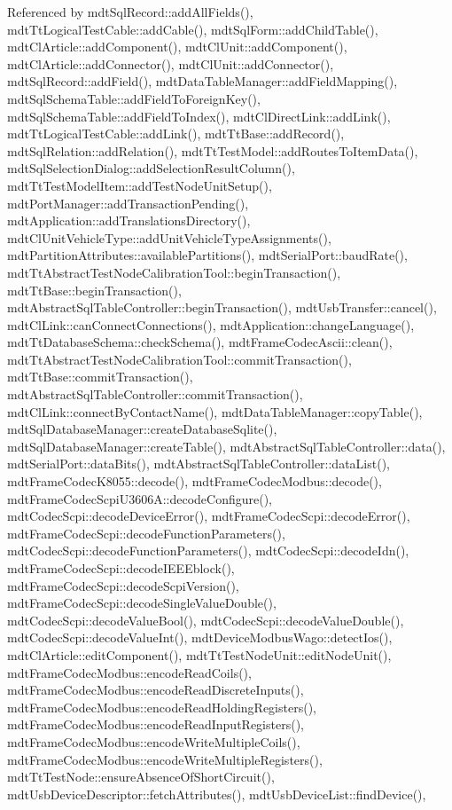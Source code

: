Referenced by mdt\-Sql\-Record\-::add\-All\-Fields(), mdt\-Tt\-Logical\-Test\-Cable\-::add\-Cable(), mdt\-Sql\-Form\-::add\-Child\-Table(), mdt\-Cl\-Article\-::add\-Component(), mdt\-Cl\-Unit\-::add\-Component(), mdt\-Cl\-Article\-::add\-Connector(), mdt\-Cl\-Unit\-::add\-Connector(), mdt\-Sql\-Record\-::add\-Field(), mdt\-Data\-Table\-Manager\-::add\-Field\-Mapping(), mdt\-Sql\-Schema\-Table\-::add\-Field\-To\-Foreign\-Key(), mdt\-Sql\-Schema\-Table\-::add\-Field\-To\-Index(), mdt\-Cl\-Direct\-Link\-::add\-Link(), mdt\-Tt\-Logical\-Test\-Cable\-::add\-Link(), mdt\-Tt\-Base\-::add\-Record(), mdt\-Sql\-Relation\-::add\-Relation(), mdt\-Tt\-Test\-Model\-::add\-Routes\-To\-Item\-Data(), mdt\-Sql\-Selection\-Dialog\-::add\-Selection\-Result\-Column(), mdt\-Tt\-Test\-Model\-Item\-::add\-Test\-Node\-Unit\-Setup(), mdt\-Port\-Manager\-::add\-Transaction\-Pending(), mdt\-Application\-::add\-Translations\-Directory(), mdt\-Cl\-Unit\-Vehicle\-Type\-::add\-Unit\-Vehicle\-Type\-Assignments(), mdt\-Partition\-Attributes\-::available\-Partitions(), mdt\-Serial\-Port\-::baud\-Rate(), mdt\-Tt\-Abstract\-Test\-Node\-Calibration\-Tool\-::begin\-Transaction(), mdt\-Tt\-Base\-::begin\-Transaction(), mdt\-Abstract\-Sql\-Table\-Controller\-::begin\-Transaction(), mdt\-Usb\-Transfer\-::cancel(), mdt\-Cl\-Link\-::can\-Connect\-Connections(), mdt\-Application\-::change\-Language(), mdt\-Tt\-Database\-Schema\-::check\-Schema(), mdt\-Frame\-Codec\-Ascii\-::clean(), mdt\-Tt\-Abstract\-Test\-Node\-Calibration\-Tool\-::commit\-Transaction(), mdt\-Tt\-Base\-::commit\-Transaction(), mdt\-Abstract\-Sql\-Table\-Controller\-::commit\-Transaction(), mdt\-Cl\-Link\-::connect\-By\-Contact\-Name(), mdt\-Data\-Table\-Manager\-::copy\-Table(), mdt\-Sql\-Database\-Manager\-::create\-Database\-Sqlite(), mdt\-Sql\-Database\-Manager\-::create\-Table(), mdt\-Abstract\-Sql\-Table\-Controller\-::data(), mdt\-Serial\-Port\-::data\-Bits(), mdt\-Abstract\-Sql\-Table\-Controller\-::data\-List(), mdt\-Frame\-Codec\-K8055\-::decode(), mdt\-Frame\-Codec\-Modbus\-::decode(), mdt\-Frame\-Codec\-Scpi\-U3606\-A\-::decode\-Configure(), mdt\-Codec\-Scpi\-::decode\-Device\-Error(), mdt\-Frame\-Codec\-Scpi\-::decode\-Error(), mdt\-Frame\-Codec\-Scpi\-::decode\-Function\-Parameters(), mdt\-Codec\-Scpi\-::decode\-Function\-Parameters(), mdt\-Codec\-Scpi\-::decode\-Idn(), mdt\-Frame\-Codec\-Scpi\-::decode\-I\-E\-E\-Eblock(), mdt\-Frame\-Codec\-Scpi\-::decode\-Scpi\-Version(), mdt\-Frame\-Codec\-Scpi\-::decode\-Single\-Value\-Double(), mdt\-Codec\-Scpi\-::decode\-Value\-Bool(), mdt\-Codec\-Scpi\-::decode\-Value\-Double(), mdt\-Codec\-Scpi\-::decode\-Value\-Int(), mdt\-Device\-Modbus\-Wago\-::detect\-Ios(), mdt\-Cl\-Article\-::edit\-Component(), mdt\-Tt\-Test\-Node\-Unit\-::edit\-Node\-Unit(), mdt\-Frame\-Codec\-Modbus\-::encode\-Read\-Coils(), mdt\-Frame\-Codec\-Modbus\-::encode\-Read\-Discrete\-Inputs(), mdt\-Frame\-Codec\-Modbus\-::encode\-Read\-Holding\-Registers(), mdt\-Frame\-Codec\-Modbus\-::encode\-Read\-Input\-Registers(), mdt\-Frame\-Codec\-Modbus\-::encode\-Write\-Multiple\-Coils(), mdt\-Frame\-Codec\-Modbus\-::encode\-Write\-Multiple\-Registers(), mdt\-Tt\-Test\-Node\-::ensure\-Absence\-Of\-Short\-Circuit(), mdt\-Usb\-Device\-Descriptor\-::fetch\-Attributes(), mdt\-Usb\-Device\-List\-::find\-Device(), 